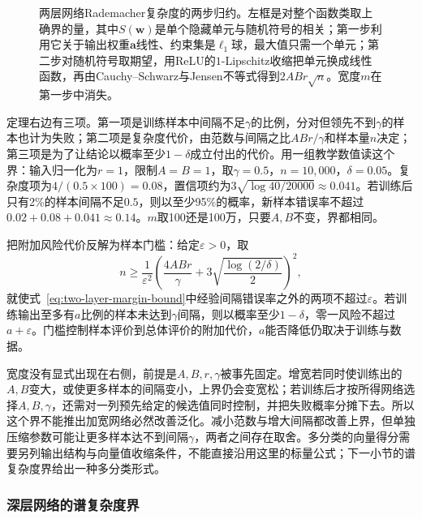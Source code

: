 \begin{figure}[htbp]
  \centering
  
  \caption{两层网络Rademacher复杂度的两步归约。左框是对整个函数类取上确界的量，其中$S(\bm w)$是单个隐藏单元与随机符号的相关；第一步利用它关于输出权重$\bm a$线性、约束集是$\ell_1$球，最大值只需一个单元；第二步对随机符号取期望，用ReLU的$1$-Lipschitz收缩把单元换成线性函数，再由Cauchy--Schwarz与Jensen不等式得到$2ABr\sqrt n$。宽度$m$在第一步中消失。}
  \label{fig:lt8-two-layer-reduction}
\end{figure}

定理右边有三项。第一项是训练样本中间隔不足$\gamma$的比例，分对但领先不到$\gamma$的样本也计为失败；第二项是复杂度代价，由范数与间隔之比$ABr/\gamma$和样本量$n$决定；第三项是为了让结论以概率至少$1-\delta$成立付出的代价。用一组教学数值读这个界：输入归一化为$r=1$，限制$A=B=1$，取$\gamma=0.5$，$n=10{,}000$，$\delta=0.05$。复杂度项为$4/(0.5\times100)=0.08$，置信项约为$3\sqrt{\log40/20000}\approx0.041$。若训练后只有2\%的样本间隔不足$0.5$，则以至少95\%的概率，新样本错误率不超过$0.02+0.08+0.041\approx0.14$。$m$取100还是100万，只要$A,B$不变，界都相同。

把附加风险代价反解为样本门槛：给定$\varepsilon>0$，取
\begin{equation}
 n\geq\frac1{\varepsilon^2}
 \left(\frac{4ABr}{\gamma}
       +3\sqrt{\frac{\log(2/\delta)}2}\right)^2,
 \label{eq:two-layer-sample-requirement}
\end{equation}
就使式~\eqref{eq:two-layer-margin-bound}中经验间隔错误率之外的两项不超过$\varepsilon$。若训练输出至多有$a$比例的样本未达到$\gamma$间隔，则以概率至少$1-\delta$，零一风险不超过$a+\varepsilon$。门槛控制样本评价到总体评价的附加代价，$a$能否降低仍取决于训练与数据。

宽度没有显式出现在右侧，前提是$A,B,r,\gamma$被事先固定。增宽若同时使训练出的$A,B$变大，或使更多样本的间隔变小，上界仍会变宽松；若训练后才按所得网络选择$A,B,\gamma$，还需对一列预先给定的候选值同时控制，并把失败概率分摊下去。所以这个界不能推出加宽网络必然改善泛化。减小范数与增大间隔都改善上界，但单独压缩参数可能让更多样本达不到间隔$\gamma$，两者之间存在取舍。多分类的向量得分需要另列输出结构与向量值收缩条件，不能直接沿用这里的标量公式；下一小节的谱复杂度界给出一种多分类形式。

\subsubsection{深层网络的谱复杂度界}

